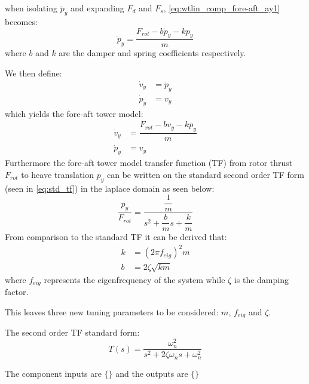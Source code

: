 when isolating $ \ddot{p}_y $ and expanding $ F_d $ and $ F_s $, \cref{eq:wtlin_comp_fore-aft_ay1} becomes:
\begin{equation}\label{eq:wtlin_comp_fore-aft_ay2}
	\ddot{p}_y = \dfrac{F_{rot} - b \dot{p}_y - k p_y}{m}
\end{equation}
where $ b $ and $ k $ are the damper and spring coefficients respectively.

We then define:
\begin{align}
	\dot{v}_y & = \ddot{p}_y \label{eq:wtlin_comp_fore-aft_ay} \\
	\dot{p}_y & = v_y \label{eq:wtlin_comp_fore-aft_vy}
\end{align}
which yields the fore-aft tower model:
\begin{align}
	\dot{v}_y & = \dfrac{F_{rot} - b v_y - k p_y}{m}  \label{eq:wtlin_comp_fore-aft_1} \\
	\dot{p}_y & = v_y \label{eq:wtlin_comp_fore-aft_2}
\end{align}
Furthermore the fore-aft tower model transfer function (TF) from rotor thrust $ F_{rot} $ to heave translation $ p_y $ can be written on the standard second order TF form (seen in \cref{eq:std_tf}) in the laplace domain as seen below:
\begin{equation}\label{eq:wtLin_fore_aft_tf}
	\dfrac{p_y}{F_{rot}} = \dfrac{\dfrac{1}{m}}{s^2 + \dfrac{b}{m} s + \dfrac{k}{m}}
\end{equation}
From comparison to the standard TF it can be derived that:
\begin{align}
	k & = (2 \pi f_{eig})^2 m \label{eq:wtLin_fore_aft_tf_k} \\
	b & = 2 \zeta \sqrt{k m} \label{eq:wtLin_fore_aft_tf_b}
\end{align}
where $ f_{eig} $ represents the eigenfrequency of the system while $ \zeta $ is the damping factor. 

This leaves three new tuning parameters to be considered: $ m $, $ f_{eig} $ and $ \zeta $. 

\medskip
The second order TF standard form:
\begin{equation}\label{eq:std_tf}
	T(s) = \dfrac{\omega_n^2}{s^2 + 2 \zeta \omega_n s + \omega_n^2}
\end{equation}

The component inputs are $ \{ \} $ and the outputs are $ \{ \} $



%
%
%

